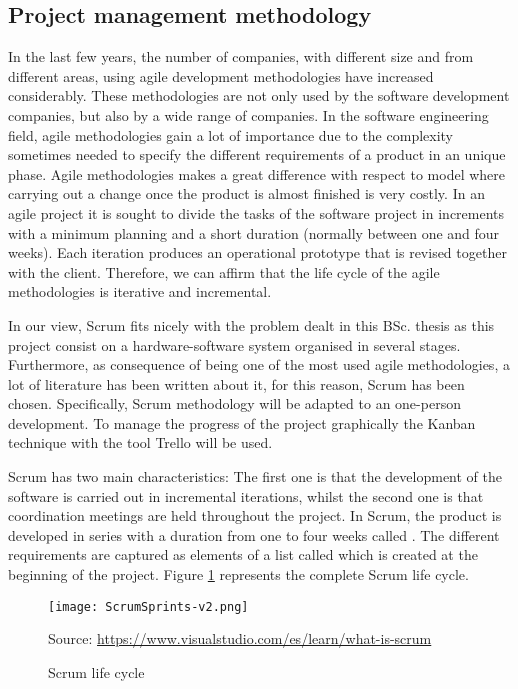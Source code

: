 \documentclass{pre-tfg}
\begin{document}
\subsection{Project management methodology}
In the last few years, the number of companies, with different size and from different areas, using agile development methodologies have increased considerably. These methodologies are not only used by the software development companies, but also by a wide range of companies. In the software engineering field, agile methodologies gain a lot of importance due to the complexity sometimes needed to specify the different requirements of a product in an unique phase. Agile methodologies makes a great difference with respect to  model where carrying out a change once the product is almost finished is very costly. In an agile project it is sought to divide the tasks of the software project in increments with a minimum planning and a short duration (normally between one and four weeks). Each iteration produces an operational prototype that is revised together with the client. Therefore, we can affirm that the life cycle of the agile methodologies is iterative and incremental.

In our view, Scrum fits nicely with the problem dealt in this BSc. thesis as this project consist on a hardware-software system organised in several stages. Furthermore, as consequence of being one of the most used agile methodologies, a lot of literature has been written about it, for this reason, Scrum has been chosen. Specifically, Scrum methodology \cite{ScrumGuide} will be adapted to an one-person development. To manage the progress of the project graphically the Kanban technique with the tool Trello will be used.

Scrum has two main characteristics: The first one is that the development of the software is carried out in incremental iterations, whilst the second one is that coordination meetings are held throughout the project. In Scrum, the product is developed in series with a duration from one to four weeks called . The different requirements are captured as elements of a list called  which is created at the beginning of the project. Figure \ref{fig:5-ScrumSprints} represents the complete Scrum life cycle.

\begin{figure}[!h]
	\begin{center}
		\texttt{[image: ScrumSprints-v2.png]}	
		\caption{Scrum life cycle}{Source: \url{https://www.visualstudio.com/es/learn/what-is-scrum}}
		\label{fig:5-ScrumSprints}
	\end{center}
\end{figure}
\end{document}
